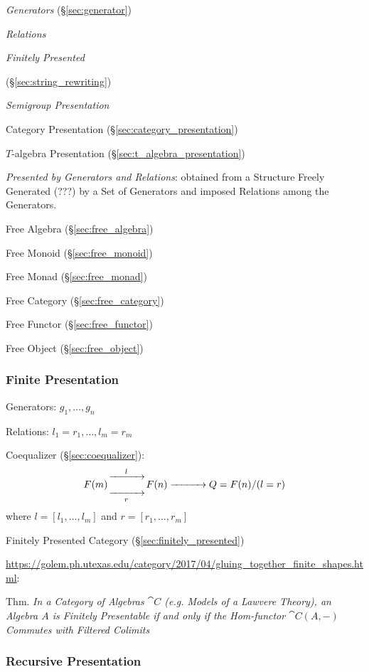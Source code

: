 \begin{itemize}
\emph{Generators} (\S\ref{sec:generator})

\emph{Relations}

\emph{Finitely Presented}

(\S\ref{sec:string_rewriting})

\emph{Semigroup Presentation}

Category Presentation (\S\ref{sec:category_presentation})

$T$-algebra Presentation (\S\ref{sec:t_algebra_presentation})

\emph{Presented by Generators and Relations}: obtained from a
Structure Freely Generated (???) by a Set of Generators and imposed
Relations among the Generators.

Free Algebra (\S\ref{sec:free_algebra})

Free Monoid (\S\ref{sec:free_monoid})

Free Monad (\S\ref{sec:free_monad})

Free Category (\S\ref{sec:free_category})

Free Functor (\S\ref{sec:free_functor})

Free Object (\S\ref{sec:free_object})



\subsubsection{Finite Presentation}\label{sec:finite_presentation}
\cite{awodey06}

Generators: $g_1, \ldots, g_n$

Relations: $l_1 = r_1, \ldots, l_m = r_m$

Coequalizer (\S\ref{sec:coequalizer}):
\[
  F(m) {\xrightarrow[\quad\quad\quad]{l}
    \atop \xrightarrow[r]{\quad\quad\quad}} F(n)
  \xrightarrow{\quad\quad\quad} Q = F(n) / (l = r)
\]
where $l = [l_1, \ldots, l_m]$ and $r = [r_1, \ldots, r_m]$

Finitely Presented Category (\S\ref{sec:finitely_presented})

\url{https://golem.ph.utexas.edu/category/2017/04/gluing_together_finite_shapes.html}:

Thm. \emph{In a Category of Algebras $\cat{C}$ (e.g. Models of a
  Lawvere Theory), an Algebra $A$ is Finitely Presentable if and only
  if the Hom-functor $\cat{C}(A,-)$ Commutes with Filtered Colimits}



\subsubsection{Recursive Presentation}\label{sec:recursive_presentation}


\end{itemize}
